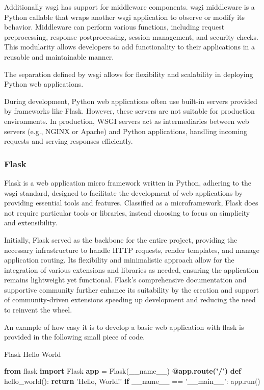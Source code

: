 Additionally \ac{wsgi} has support for middleware components. \ac{wsgi} middleware is a Python callable that wraps another 
\ac{wsgi} application to observe or modify its behavior. Middleware can perform various functions, including request 
preprocessing, response postprocessing, session management, and security checks. This modularity allows developers to 
add functionality to their applications in a reusable and maintainable manner.

The separation defined by \ac{wsgi} allows for flexibility and scalability in deploying Python web applications.

During development, Python web applications often use built-in servers provided by frameworks like Flask. 
However, these servers are not suitable for production environments. In production, WSGI servers act as intermediaries 
between web servers (e.g., NGINX or Apache) and Python applications, handling incoming requests and serving responses 
efficiently.

\subsubsection{Flask}
Flask is a web application micro framework written in Python, adhering to the \ac{wsgi} standard, designed to 
facilitate the development of web applications by providing essential tools and features. Classified as a microframework, 
Flask does not require particular tools or libraries, instead choosing to focus on simplicity and extensibility\cite{flask2025}.

Initially, Flask served as the backbone for the entire project, providing the necessary infrastructure to handle HTTP 
requests, render templates, and manage application routing. Its flexibility and minimalistic approach allow for the 
integration of various extensions and libraries as needed, ensuring the application remains lightweight yet functional. 
Flask's comprehensive documentation and supportive community further enhance its suitability by the creation and support
of community-driven extensions speeding up development and reducing the need to reinvent the wheel.

An example of how easy it is to develop a basic web application with flask is provided in the following small 
piece of code.

\begin{algorithm}
  \caption{Flask Hello World}\label{flask-hello-world}
  \begin{algorithmic}[1]
    \State \textbf{from} flask \textbf{import} Flask
    \State \textbf{app} = Flask(\_\_name\_\_)
    \State
    \State \textbf{@app.route('/')}
    \State \textbf{def} hello\_world():
    \State \hspace{1em} \textbf{return} 'Hello, World!'
    \State
    \State \textbf{if} \_\_name\_\_ == '\_\_main\_\_':
    \State \hspace{1em} app.run()
  \end{algorithmic}
\end{algorithm}

